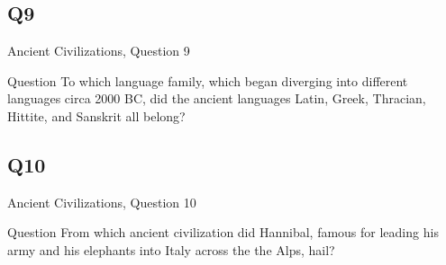 \documentclass[11pt]{beamer}
\begin{document}
\subsection*{Q9}
\begin{frame}[t]{Ancient Civilizations, Question 9}
\begin{block}{Question}
To which language family, which began diverging into different languages circa  2000 BC, did the ancient languages Latin, Greek, Thracian, Hittite, and Sanskrit all belong?
\end{block}
\end{frame}
\subsection*{Q10}
\begin{frame}[t]{Ancient Civilizations, Question 10}
\begin{block}{Question}
From which ancient civilization did Hannibal, famous for leading his army and his elephants into Italy across the the Alps, hail?
\end{block}
\end{frame}
\end{document}
